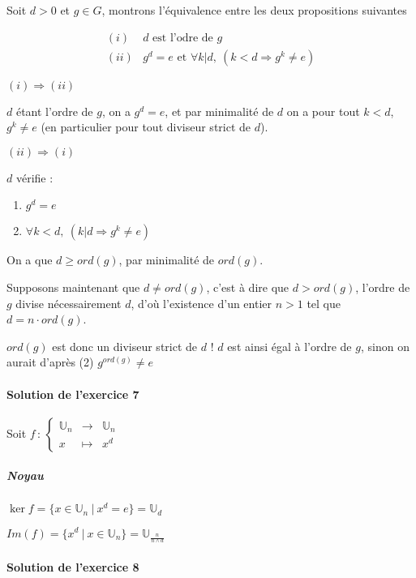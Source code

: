 \documentclass[]{article}
\theoremstyle{remark}
\theoremstyle{definition}
\newcommand{\func}[5]{
#1 \, : \, \left\{ \begin{array}{lcl}
	#2 & \longrightarrow & #3 \\
	#4 & \longmapsto & #5
\end{array}
\right.
}
\newenvironment{proofpart}[1]{
	\noindent
	{\textbf{\boldmath #1}}
}{
	\checkmark
}
\begin{document}
Soit $d > 0$ et $g \in G$, montrons l'équivalence entre les deux propositions suivantes

$$
\begin{array}{ll}
	(i) & d \text{ est l'odre de } g \\
	(ii) & g^d=e \text{ et } \forall k | d, ~ (k < d \Longrightarrow g^k \neq e)
\end{array}
$$

\noindent
\begin{proofpart}{$(i) \Longrightarrow (ii)$}

	$d$ étant l'ordre de $g$, on a $g^d=e$, et par minimalité de $d$ on a pour tout $k < d$, $g^k \neq e$ (en particulier pour tout diviseur strict de $d$).
\end{proofpart}

\begin{proofpart}{$(ii) \Longrightarrow (i)$}

	$d$ vérifie :
	\begin{enumerate}
		\item $g^d=e$
		\item $\forall k < d, ~ (k | d \Longrightarrow g^k \neq e)$
	\end{enumerate}
	
	On a que $d \geqslant ord(g)$, par minimalité de $ord(g)$.
	
	Supposons maintenant que $d \neq ord(g)$, c'est à dire que $d > ord(g)$, l'ordre de $g$ divise nécessairement $d$, d'où l'existence d'un entier $n > 1$ tel que $d= n \cdot ord(g)$.
	
	$ord(g)$ est donc un diviseur strict de $d$ ! $d$ est ainsi égal à l'ordre de $g$, sinon on aurait d'après (2) $g^{ord(g)} \neq e$
\end{proofpart}

\paragraph{Solution de l'exercice 7}

Soit $\func{f}{\mathbb{U}_n}{\mathbb{U}_n}{x}{x^d}$

\subparagraph{Noyau}

$\ker f = \{x \in \mathbb{U}_n ~ | ~ x^d = e \} = \mathbb{U}_d$

$Im(f)=\{x^d ~|~ x \in \mathbb{U}_n\}=\mathbb{U}_{\frac{n}{n \land d}}$

\paragraph{Solution de l'exercice 8}
\end{document}
